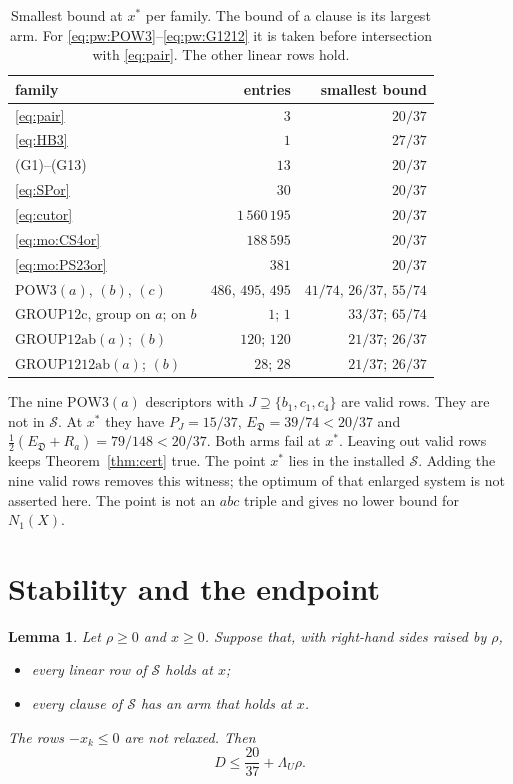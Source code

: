 \documentclass{amsart}
\newtheorem{lemma}{Lemma}[section]
\theoremstyle{definition}
\theoremstyle{plain}
\numberwithin{equation}{section}
\numberwithin{table}{section}
\begin{document}
\begin{table}[ht]
\centering\small
\caption{Smallest bound at $x^*$ per family. The bound of a clause is its
largest arm. For \eqref{eq:pw:POW3}--\eqref{eq:pw:G1212} it is taken before
intersection with \eqref{eq:pair}. The other linear rows hold.}\label{tab:wit}
\begin{tabular}{@{}lrr@{}}
\hline family & entries & smallest bound\\\hline
\eqref{eq:pair} & $3$ & $20/37$\\
\eqref{eq:HB3} & $1$ & $27/37$\\
(G1)--(G13) & $13$ & $20/37$\\
\eqref{eq:SPor} & $30$ & $20/37$\\
\eqref{eq:cutor} & $1\,560\,195$ & $20/37$\\
\eqref{eq:mo:CS4or} & $188\,595$ & $20/37$\\
\eqref{eq:mo:PS23or} & $381$ & $20/37$\\
$\mathrm{POW3}(a)$, $(b)$, $(c)$ & $486$, $495$, $495$ & $41/74$, $26/37$, $55/74$\\
$\mathrm{GROUP12c}$, group on $a$; on $b$ & $1$; $1$ & $33/37$; $65/74$\\
$\mathrm{GROUP12ab}(a)$; $(b)$ & $120$; $120$ & $21/37$; $26/37$\\
$\mathrm{GROUP1212ab}(a)$; $(b)$ & $28$; $28$ & $21/37$; $26/37$\\
\hline
\end{tabular}
\end{table}

The nine $\mathrm{POW3}(a)$ descriptors with $J\supseteq\{b_1,c_1,c_4\}$ are
valid rows. They are not in $\mathcal S$. At $x^*$ they have $P_J=15/37$,
$E_{\mathfrak D}=39/74<20/37$ and
$\tfrac12(E_{\mathfrak D}+R_a)=79/148<20/37$. Both arms fail at $x^*$.
Leaving out valid rows keeps
Theorem~\ref{thm:cert} true. The point $x^*$ lies in the installed $\mathcal S$.
Adding the nine valid rows removes this witness; the optimum of that enlarged
system is not asserted here. The point is not an $abc$ triple and gives no
lower bound for $N_1(X)$.

\section{Stability and the endpoint}\label{sec:end}

\begin{lemma}\label{lem:stab}
Let $\rho\ge0$ and $x\ge0$. Suppose that, with right-hand sides raised by
$\rho$,
\begin{itemize}
\item every linear row of $\mathcal S$ holds at $x$;
\item every clause of $\mathcal S$ has an arm that holds at $x$.
\end{itemize}
The rows $-x_k\le0$ are not relaxed. Then
\begin{equation}\label{eq:stab}
 D\le\frac{20}{37}+\Lambda_U\rho .
\end{equation}
\end{lemma}
\end{document}
